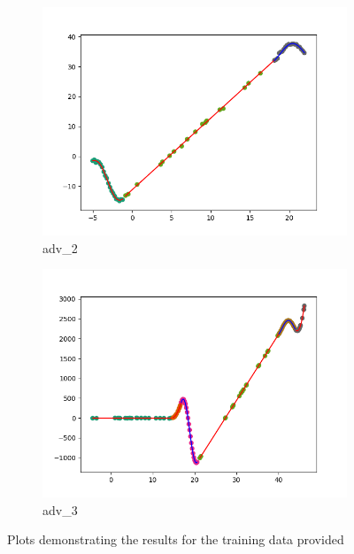 \documentclass[notitlepage, 11pt]{report}
\begin{document}
\begin{figure}[H]
			
				\medskip
				\begin{subfigure}{0.25\textwidth}
					\includegraphics[width=\linewidth]{Figure_10}
					\caption{adv\_2}
					\label{fig:10}
				\end{subfigure}\hfil %
				\begin{subfigure}{0.25\textwidth}
					\includegraphics[width=\linewidth]{Figure_11}
					\caption{adv\_3}
					\label{fig:11}
				\end{subfigure}\hfil %
		
				
			
				\caption{Plots demonstrating the results for the training data provided}
				\label{fig:images}
			\end{figure}
		
\end{document}
